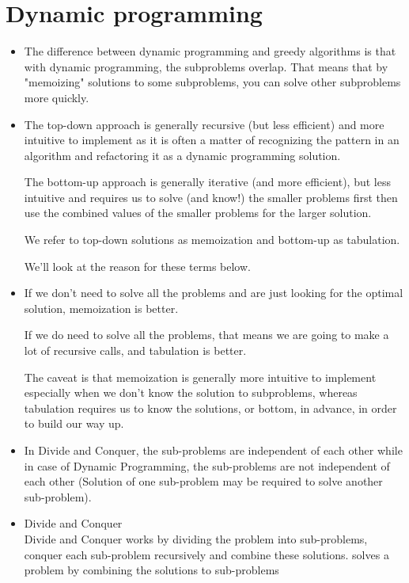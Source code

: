 \documentclass[a4paper,12pt,twoside]{book}
\begin{document}
\section{Dynamic programming}
\begin{itemize}
\item The difference between dynamic programming and greedy algorithms is that with dynamic programming, the subproblems overlap. That means that by "memoizing" solutions to some subproblems, you can solve other subproblems more quickly.   


\item The top-down approach is generally recursive (but less efficient) and more intuitive to implement as it is often a matter of recognizing the pattern in an algorithm and refactoring it as a dynamic programming solution.

The bottom-up approach is generally iterative (and more efficient), but less intuitive and requires us to solve (and know!) the smaller problems first then use the combined values of the smaller problems for the larger solution.

We refer to top-down solutions as memoization and bottom-up as tabulation.

We’ll look at the reason for these terms below.

\item If we don’t need to solve all the problems and are just looking for the optimal solution, memoization is better.

If we do need to solve all the problems, that means we are going to make a lot of recursive calls, and tabulation is better.

The caveat is that memoization is generally more intuitive to implement especially when we don’t know the solution to subproblems, whereas tabulation requires us to know the solutions, or bottom, in advance, in order to build our way up.

\item In Divide and Conquer, the sub-problems are independent of each other while in case of Dynamic Programming, the sub-problems are not independent of each other (Solution of one sub-problem may be required to solve another sub-problem).

\item Divide and Conquer \\

Divide and Conquer works by dividing the problem into sub-problems, conquer each sub-problem recursively and combine these solutions. solves a problem by combining the solutions to  sub-problems


\end{itemize}
\end{document}
